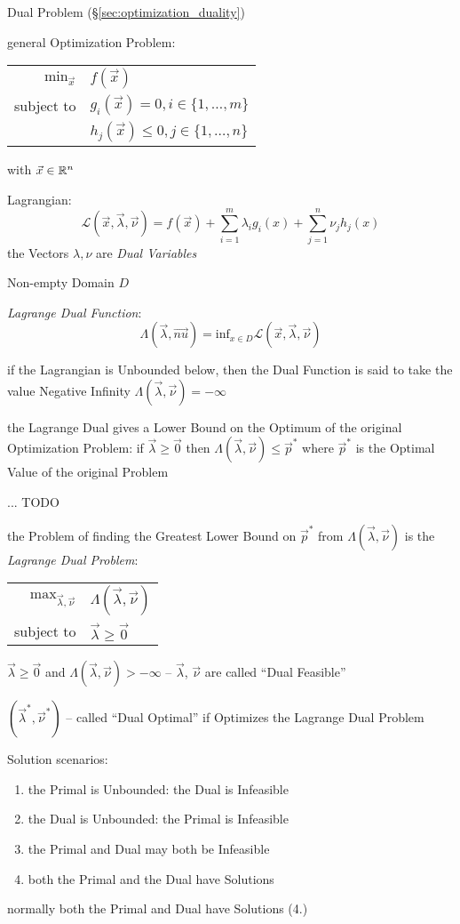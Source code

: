 Dual Problem (\S\ref{sec:optimization_duality})

general Optimization Problem:

\begin{tabular}{r l}
  $\mathrm{min}_{\vec{x}}$ & $f(\vec{x})$      \\
  subject to               & $g_i(\vec{x}) = 0, i \in \{1,\ldots,m\}$ \\
                           & $h_j(\vec{x}) \leq 0, j \in \{1,\ldots,n\}$
\end{tabular}

with $\vec{x} \in \mathbb{R}^n$

Lagrangian:
\[
  \mathcal{L}(\vec{x},\vec{\lambda},\vec{\nu}) =
    f(\vec{x}) + \sum_{i=1}^m\lambda_i g_i(x) + \sum_{j=1}^n \nu_j h_j(x)
\]
the Vectors $\lambda, \nu$ are \emph{Dual Variables}

Non-empty Domain $D$

\emph{Lagrange Dual Function}:
\[
  \Lambda(\vec{\lambda}, \vec{nu}) =
    \mathrm{inf}_{x \in D} \mathcal{L}(\vec{x},\vec{\lambda},\vec{\nu})
\]

if the Lagrangian is Unbounded below, then the Dual Function is said to take
the value Negative Infinity $\Lambda(\vec{\lambda}, \vec{\nu}) = -\infty$

the Lagrange Dual gives a Lower Bound on the Optimum of the original
Optimization Problem: if $\vec{\lambda} \geq \vec{0}$ then
$\Lambda(\vec{\lambda}, \vec{\nu}) \leq \vec{p}^*$ where $\vec{p}^*$ is the
Optimal Value of the original Problem

... TODO

the Problem of finding the Greatest Lower Bound on $\vec{p}^*$ from
$\Lambda(\vec{\lambda},\vec{\nu})$ is the \emph{Lagrange Dual Problem}:
\begin{tabular}{r l}
  $\mathrm{max}_{\vec{\lambda},\vec{\nu}}$ &
    $\Lambda(\vec{\lambda},\vec{\nu})$ \\
  subject to & $\vec{\lambda} \geq \vec{0}$ \\
\end{tabular}

$\vec{\lambda} \geq \vec{0}$ and $\Lambda(\vec{\lambda},\vec{\nu}) > -\infty$
  -- $\vec{\lambda}$, $\vec{\nu}$ are called ``Dual Feasible''

$(\vec{\lambda}^*, \vec{\nu}^*)$ -- called ``Dual Optimal'' if Optimizes the
Lagrange Dual Problem


Solution scenarios:
\begin{enumerate}
  \item the Primal is Unbounded: the Dual is Infeasible
  \item the Dual is Unbounded: the Primal is Infeasible
  \item the Primal and Dual may both be Infeasible
  \item both the Primal and the Dual have Solutions
\end{enumerate}
normally both the Primal and Dual have Solutions (4.)


